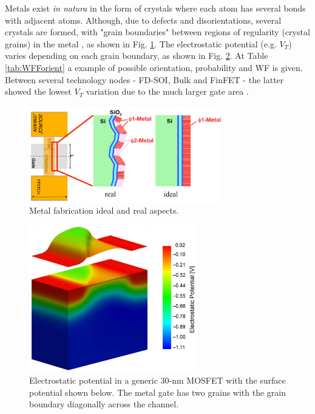 \documentclass[pgmicro,mestrado,english]{iiufrgs}
\begin{document}
Metals exist \textit{in natura} in the form of crystals where each atom has several bonds with adjacent atoms. Although, due to defects and disorientations, several crystals are formed, with "grain boundaries" between regions of regularity (crystal grains) in the metal \cite{dadgour2008statistical}, as shown in Fig. \ref{fig:meinMetalFab}. The electrostatic potential (e.g. $V_T$) varies depending on each grain boundary, as shown in Fig. \ref{WFFelectros}. At Table \ref{tab:WFForient} a example of possible orientation, probability and WF is given. Between several technology nodes - FD-SOI, Bulk and FinFET - the latter showed the lowest $V_T$ variation due to the much larger gate area \cite{dadgour2008statistical}.

\begin{figure} [H]
        \centering
	\includegraphics[width=0.75\textwidth, trim={0 0 0 0},clip]{chrome_2019-05-15_16-55-31.pdf}
        \caption{Metal fabrication ideal and real aspects.}
        \label{fig:meinMetalFab}
\end{figure}

\begin{figure} [H]
        \centering
        \includegraphics[width=0.65\textwidth, trim={0 0 0 0},clip]{pic-selected-190513-1743-08.pdf}
        \caption{Electrostatic potential in a generic 30-nm MOSFET with the surface potential shown below. The metal gate has two grains with the grain boundary diagonally across the channel.}
        \label{WFFelectros}
\end{figure}
\end{document}
